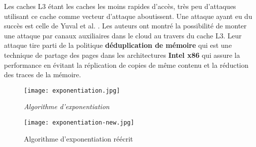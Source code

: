 Les caches L3 étant les caches les moins rapides d’accès,  très peu d’attaques utilisant ce cache comme vecteur d’attaque aboutissent. Une attaque ayant eu du succès est celle de Yuval et al. \cite{Yuval}. Les auteurs ont montré la possibilité de monter une attaque par canaux auxiliaires dans le cloud au travers du cache L3.  Leur attaque tire parti de la politique  \textbf{ déduplication de mémoire} qui est une technique de partage des pages dans les architectures \textbf{ Intel x86} qui assure la performance en  évitant  la réplication de copies de même contenu et la réduction des traces de la mémoire. 


\begin{figure}[h!]
   \begin{minipage}[b]{0.50\linewidth}
      \centering \texttt{[image: exponentiation.jpg]}
      \caption{\it Algorithme d'exponentiation}
   \end{minipage}\hfill
   \begin{minipage}[b]{0.50\linewidth}   
      \centering \texttt{[image: exponentiation-new.jpg]}
      \caption{Algorithme d'exponentiation réécrit}       
   \end{minipage}
\end{figure}    

